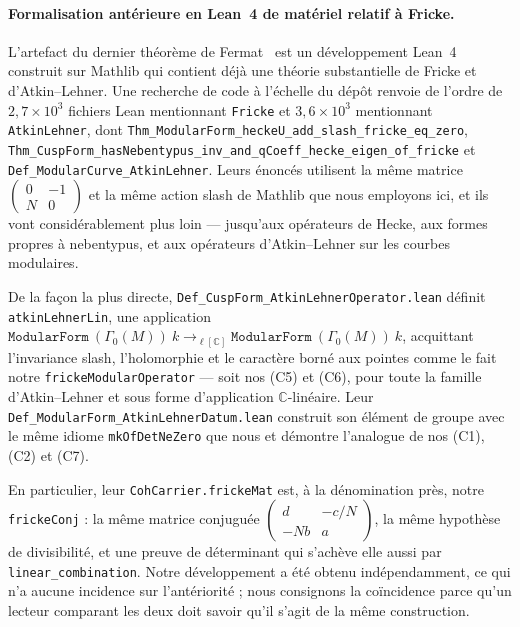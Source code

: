 \documentclass[11pt, a4paper]{article}
\newcommand{\brk}{\discretionary{}{}{}}
\theoremstyle{remark}
\begin{document}
\paragraph{Formalisation antérieure en Lean~4 de matériel relatif à Fricke.}
L'artefact du dernier théorème de Fermat~\cite{FLT2026} est un développement Lean~4 construit
sur Mathlib qui contient déjà une théorie substantielle de Fricke et d'Atkin--Lehner. Une recherche
de code à l'échelle du dépôt renvoie de l'ordre de $2{,}7\times10^3$ fichiers Lean mentionnant
\texttt{Fricke} et $3{,}6\times10^3$ mentionnant \texttt{AtkinLehner}, dont
\texttt{Thm\_ModularForm\_heckeU\_add\brk\_slash\brk\_fricke\brk\_eq\brk\_zero},
\texttt{Thm\_CuspForm\_hasNebentypus\brk\_inv\brk\_and\brk\_qCoeff\brk\_hecke\brk\_eigen\brk\_of\brk\_fricke} et
\texttt{Def\_ModularCurve\_AtkinLehner}. Leurs énoncés utilisent la même matrice
$\left(\begin{smallmatrix} 0 & -1 \\ N & 0\end{smallmatrix}\right)$ et la même action slash de
Mathlib que nous employons ici, et ils vont considérablement plus loin --- jusqu'aux opérateurs de
Hecke, aux formes propres à nebentypus, et aux opérateurs d'Atkin--Lehner sur les courbes
modulaires.

De la façon la plus directe, \texttt{Def\_CuspForm\_AtkinLehnerOperator.lean} définit
\texttt{atkinLehnerLin}, une application
$\texttt{ModularForm}\ (\Gamma_0(M))\ k \to_{\ell[\mathbb{C}]} \texttt{ModularForm}\ (\Gamma_0(M))\ k$,
acquittant l'invariance slash, l'holomorphie et le caractère borné aux pointes comme le fait notre
\texttt{frickeModularOperator} --- soit nos (C5) et (C6), pour toute la famille d'Atkin--Lehner et
sous forme d'application $\mathbb{C}$-linéaire. Leur
\texttt{Def\_ModularForm\_AtkinLehnerDatum.lean} construit son élément de groupe avec le même
idiome \texttt{mkOfDetNeZero} que nous et démontre l'analogue de nos (C1), (C2) et (C7).

En particulier, leur \texttt{CohCarrier.frickeMat} est, à la dénomination près, notre
\texttt{frickeConj} : la même matrice conjuguée
$\left(\begin{smallmatrix} d & -c/N \\ -Nb & a\end{smallmatrix}\right)$, la même hypothèse de
divisibilité, et une preuve de déterminant qui s'achève elle aussi par
\texttt{linear\_combination}. Notre développement a été obtenu indépendamment, ce qui n'a aucune
incidence sur l'antériorité ; nous consignons la coïncidence parce qu'un lecteur comparant les deux
doit savoir qu'il s'agit de la même construction.
\end{document}
